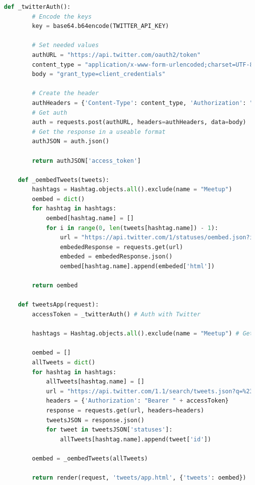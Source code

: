 \documentclass[draftclsnofoot,10pt,onecolumn]{IEEEtran} %
\begin{document}
\begin{center}
\captionsetup{width=.5\linewidth}
  \begin{lstlisting}[caption=Views.py showing the Twitter authorization and
  search for tweets from the application., language=Python]
    def _twitterAuth():
        # Encode the keys
        key = base64.b64encode(TWITTER_API_KEY)

        # Set needed values
        authURL = "https://api.twitter.com/oauth2/token"
        content_type = "application/x-www-form-urlencoded;charset=UTF-8"
        body = "grant_type=client_credentials"

        # Create the header
        authHeaders = {'Content-Type': content_type, 'Authorization': "Basic " + key}
        # Get auth
        auth = requests.post(authURL, headers=authHeaders, data=body)
        # Get the response in a useable format
        authJSON = auth.json()
        
        return authJSON['access_token']

    def _oembedTweets(tweets):
        hashtags = Hashtag.objects.all().exclude(name = "Meetup")
        oembed = dict()
        for hashtag in hashtags:
            oembed[hashtag.name] = []
            for i in range(0, len(tweets[hashtag.name]) - 1):
                url = "https://api.twitter.com/1/statuses/oembed.json?id=" + str(tweets[hashtag.name][i])
                embededResponse = requests.get(url)
                embeded = embededResponse.json()
                oembed[hashtag.name].append(embeded['html'])

        return oembed

    def tweetsApp(request):
        accessToken = _twitterAuth() # Auth with Twitter

        hashtags = Hashtag.objects.all().exclude(name = "Meetup") # Get hashtags

        oembed = []
        allTweets = dict()
        for hashtag in hashtags:
            allTweets[hashtag.name] = []
            url = "https://api.twitter.com/1.1/search/tweets.json?q=%23" + hashtag.name + "+%23Meetup&src=typd"
            headers = {'Authorization': "Bearer " + accessToken}
            response = requests.get(url, headers=headers)
            tweetsJSON = response.json()
            for tweet in tweetsJSON['statuses']:
                allTweets[hashtag.name].append(tweet['id'])

        oembed = _oembedTweets(allTweets)

        return render(request, 'tweets/app.html', {'tweets': oembed})
  \end{lstlisting}
\end{center}
\end{document}
